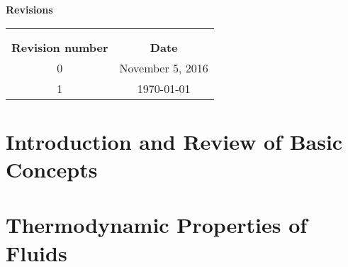 \documentclass[11pts,a4paper,amsmath,amssymb,floatfix]{book}
\makeatletter
\theoremstyle{definition}
\newcommand{\blue}{\textcolor{blue}}
\newcounter{mcounter}
\newcounter{examplecounter}
\newcounter{problemcounter}
\def\etocarticlestyle{%
    \etocsettocstyle
    {\section *{\contentsname
         }
         }
    {}}
\newcommand{\extraPartText}[1]{\def\@extraPartText{#1}}
\makeatother
\begin{document}
\begin{center}
  \Large{ \bf Revisions}

\bigskip

\begin{tabular}{ c c}
\hline
                         &                    \\
                         &                    \\
{\bf Revision number}    & {\bf Date }        \\
\hline
  0                      & November 5, 2016   \\
  1                      & \today             \\
\hline 
\end{tabular}
\end{center}

\setcounter{page}{1}

\tableofcontents
\vfill
\etocarticlestyle

\pagebreak
\listoftables
\vfill
\pagebreak
\listoffigures
\vfill
\pagebreak

\makeatletter\@openrightfalse
\extraPartText{\blue{(Contents of this Part are not examinable. They were designed to help with some of the notations and definitions used in the remaining of this Notes.)}}
\part{Introduction and Review of Basic Concepts}
     \setcounter{examplecounter}{0}
     \setcounter{examplecounter}{0}
     \setcounter{examplecounter}{0}

\part{Thermodynamic Properties of Fluids}  
     \setcounter{examplecounter}{0} 
     \setcounter{problemcounter}{0}
     \setcounter{examplecounter}{0}
     \setcounter{problemcounter}{0}
\end{document}

